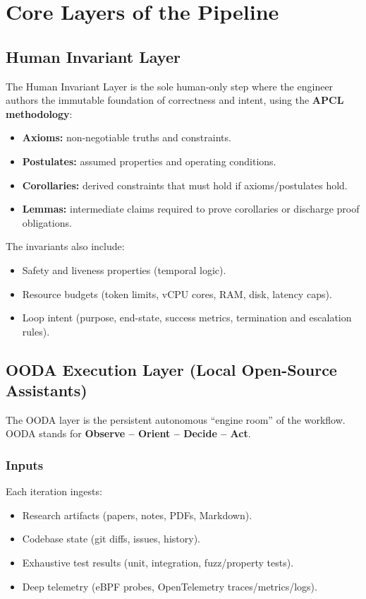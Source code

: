 \documentclass[11pt]{article}
\begin{document}
\section{Core Layers of the Pipeline}

\subsection{Human Invariant Layer}

The Human Invariant Layer is the sole human-only step where the engineer authors the immutable foundation
of correctness and intent, using the \textbf{APCL methodology}:

\begin{itemize}
  \item \textbf{Axioms:} non-negotiable truths and constraints.
  \item \textbf{Postulates:} assumed properties and operating conditions.
  \item \textbf{Corollaries:} derived constraints that must hold if axioms/postulates hold.
  \item \textbf{Lemmas:} intermediate claims required to prove corollaries or discharge proof obligations.
\end{itemize}

The invariants also include:
\begin{itemize}
  \item Safety and liveness properties (temporal logic).
  \item Resource budgets (token limits, vCPU cores, RAM, disk, latency caps).
  \item Loop intent (purpose, end-state, success metrics, termination and escalation rules).
\end{itemize}

\subsection{OODA Execution Layer (Local Open-Source Assistants)}

The OODA layer is the persistent autonomous ``engine room'' of the workflow.
OODA stands for \textbf{Observe -- Orient -- Decide -- Act}.

\subsubsection{Inputs}
Each iteration ingests:
\begin{itemize}
  \item Research artifacts (papers, notes, PDFs, Markdown).
  \item Codebase state (git diffs, issues, history).
  \item Exhaustive test results (unit, integration, fuzz/property tests).
  \item Deep telemetry (eBPF probes, OpenTelemetry traces/metrics/logs).
\end{itemize}
\end{document}
